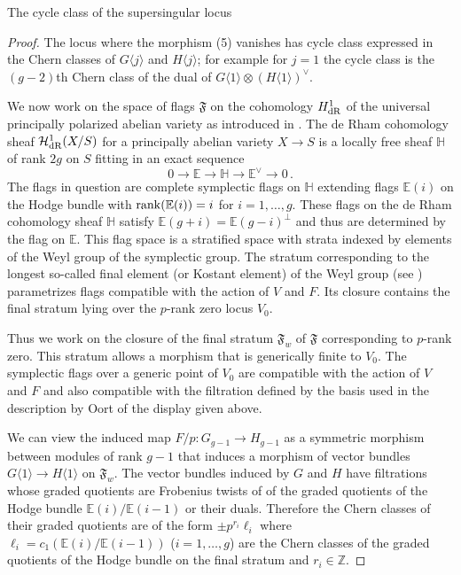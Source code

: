 \documentclass[11pt]{amsart}
\numberwithin{equation}{section}
\newcommand{\EE}{\mathbb E}
\newcommand{\HH}{\mathbb H}
\newcommand{\ZZ}{\mathbb Z}
\theoremstyle{definition}
\theoremstyle{remark}
\begin{document}
\begin{section}{The cycle class of the supersingular locus}
\begin{proof}
The locus where the morphism (5) vanishes has cycle class expressed in the Chern
classes of $G\langle j\rangle$ and $H\langle j \rangle$; for example for $j=1$ 
the cycle class 
is the $(g-2)$th Chern class of the dual of $G\langle 1\rangle \otimes
(H\langle 1 \rangle)^{\vee}$. 

\bigskip

We now work on the space of flags $\mathfrak{F}$ 
on the cohomology $H^1_{\rm dR}$
of the universal principally polarized abelian variety
as introduced in \cite[Section 3]{E-vdG}. The de Rham cohomology sheaf ${\mathcal H}^1_{\rm dR}(X/S)$
for a principally abelian variety $X \to S$ is a locally free sheaf ${\HH}$ 
of rank $2g$ on $S$ fitting in an
exact sequence
$$
0 \to {\EE} \to {\HH} \to {\EE}^{\vee} \to 0 \, .
$$
The flags in question
are complete symplectic flags on ${\HH}$ extending flags ${\EE}(i)$ on the Hodge bundle
with ${\rm rank}({\EE}(i))=i$
for $i=1,\ldots,g$. These 
flags on the de Rham cohomology sheaf ${\HH}$ satisfy ${\EE}(g+i)={\EE}(g-i)^{\bot}$ and thus are
determined by the flag on ${\EE}$.
This flag space is a stratified space with strata indexed by elements of the Weyl group
of the symplectic group. 
The stratum corresponding to the longest so-called final element (or Kostant element) 
of the Weyl group 
(see \cite[Section 3]{E-vdG}) 
parametrizes flags compatible with the action of $V$ and $F$. Its closure contains
the final stratum lying over the $p$-rank zero locus $V_0$.

Thus we work on the closure of the 
final stratum $\mathfrak{F}_w$ of $\mathfrak{F}$ corresponding to 
$p$-rank zero. This stratum allows a morphism that is generically finite to $V_0$.
The symplectic flags over a generic point of $V_0$ are compatible with the action
of $V$ and $F$ and also compatible with the filtration defined by the 
basis used in the description by Oort of the
display given above.  

We can view the induced map $F/p: G_{g-1} \to H_{g-1}$ 
as a symmetric 
morphism between modules of rank $g-1$ that induces a morphism of vector bundles $G\langle 1 \rangle \to H\langle 1 \rangle$ on $\mathfrak{F}_w$.
The vector bundles induced by $G$ and $H$ have filtrations
whose graded quotients are Frobenius twists of 
of the graded quotients
of the Hodge bundle
${\EE}(i)/{\EE}(i-1)$ or their duals.
Therefore the Chern classes of their graded quotients are of the form
$\pm p^{r_i} \ell_i$ where $\ell_i=c_1({\EE}(i)/{\EE}(i-1))$ ($i=1,\ldots,g$) 
are the Chern classes of the graded quotients 
of the Hodge bundle on the final stratum and $r_i \in {\ZZ}$.


\end{proof}
\end{section}
\end{document}
